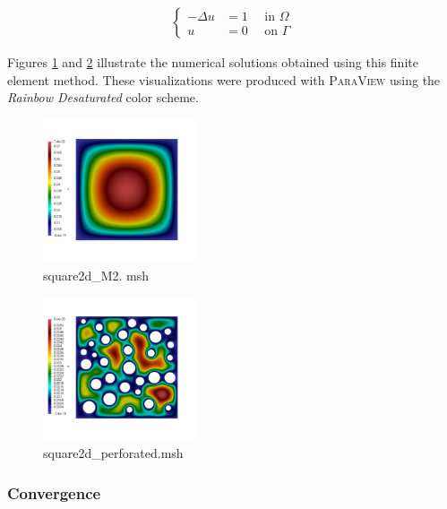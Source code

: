 \documentclass[english,10pt,a4paper]{article}
\begin{document}
\begin{eqnarray*}
\left\{
  \begin{aligned}
    - \Delta u &= 1 \quad \text{ in } \Omega \\
    u &= 0 \quad \text{ on } \Gamma
  \end{aligned}
  \right.
\end{eqnarray*}

Figures \ref{fig:res_square2d_M2} and \ref{fig:res_square2d_perforated} illustrate the numerical solutions obtained using this finite element method.
These visualizations were produced with \textsc{ParaView} using the \textit{Rainbow Desaturated} color scheme.

\begin{multicols}{2}
  \begin{figure}[H]
  \centering
  \includegraphics[width=0.4\textwidth]{docs/modules/ROOT/images/resultat_f1_nonperfo.png}
  \caption{square2d\_M2. msh}
  \label{fig:res_square2d_M2}
  \end{figure}
  \columnbreak
  \begin{figure}[H]
  \centering
  \includegraphics[width=0.4\textwidth]{docs/modules/ROOT/images/resultat_f1_perfo.png}
  \caption{square2d\_perforated.msh}
  \label{fig:res_square2d_perforated}
  \end{figure}
\end{multicols}


\subsubsection{Convergence}
\end{document}
